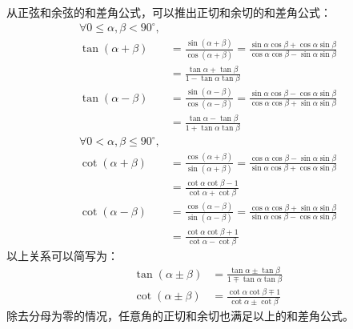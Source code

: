 \documentclass[12pt,UTF8,fontset=none]{ctexbook}
\begin{document}
从正弦和余弦的和差角公式，可以推出正切和余切的和差角公式：
\begin{align*}
    \forall 0 \leqslant \alpha, \beta < 90^\circ, &  \\
    \tan (\alpha + \beta) &= \frac{\sin (\alpha + \beta)}{\cos (\alpha + \beta)} = \frac{\sin\alpha \cos \beta + \cos \alpha \sin\beta}{\cos \alpha \cos \beta - \sin\alpha \sin \beta}  \\
    &= \frac{\tan \alpha + \tan \beta}{1 - \tan \alpha \tan \beta}    \\ 
    \tan (\alpha - \beta) &= \frac{\sin (\alpha - \beta)}{\cos (\alpha - \beta)} = \frac{\sin\alpha \cos \beta - \cos \alpha \sin\beta}{\cos \alpha \cos \beta + \sin\alpha \sin \beta}  \\
    &= \frac{\tan \alpha - \tan \beta}{1 + \tan \alpha \tan \beta}  
\end{align*}
\begin{align*}
    \forall 0 < \alpha, \beta \leqslant 90^\circ, &  \\
    \cot (\alpha + \beta) &= \frac{\cos (\alpha + \beta)}{\sin (\alpha + \beta)} = \frac{\cos \alpha \cos \beta - \sin\alpha \sin \beta}{\sin\alpha \cos \beta + \cos \alpha \sin\beta}  \\
    &= \frac{\cot \alpha \cot \beta - 1}{\cot \alpha + \cot \beta}   \\
    \cot (\alpha - \beta) &= \frac{\cos (\alpha - \beta)}{\sin (\alpha - \beta)} = \frac{\cos \alpha \cos \beta + \sin\alpha \sin \beta}{\sin\alpha \cos \beta - \cos \alpha \sin\beta}  \\
    &= \frac{\cot \alpha \cot \beta + 1}{\cot \alpha - \cot \beta}   
\end{align*}
以上关系可以简写为：
\begin{align*}
    \tan (\alpha \pm \beta) &= \frac{\tan \alpha \pm \tan \beta}{1 \mp \tan \alpha \tan \beta}  \\
    \cot (\alpha \pm \beta) &= \frac{\cot \alpha \cot \beta \mp 1}{\cot \alpha \pm \cot \beta} 
\end{align*}
除去分母为零的情况，任意角的正切和余切也满足以上的和差角公式。
\end{document}
